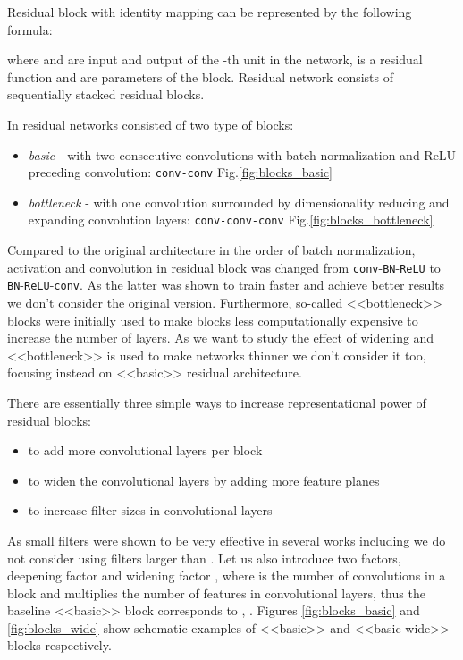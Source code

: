 \documentclass{bmvc2k}
\begin{document}
Residual block with identity mapping can be represented by the following formula:


where  and  are input and output of the -th unit in the network,  is a residual function and  are parameters of the block. Residual network consists of sequentially stacked residual blocks.

In \cite{basicblock2} residual networks consisted of two type of blocks:

\begin{itemize}
  \item{\textit{basic} - with two consecutive  convolutions with batch normalization and ReLU preceding convolution: \texttt{conv-conv} Fig.\ref{fig:blocks_basic}}
  \item{\textit{bottleneck} - with one  convolution surrounded by dimensionality reducing and expanding  convolution layers: \texttt{conv-conv-conv} Fig.\ref{fig:blocks_bottleneck}}
\end{itemize}

Compared to the original architecture \cite{he2015deep} in \cite{basicblock2} the order of batch normalization, activation and convolution in residual block was changed from \texttt{conv}-\texttt{BN}-\texttt{ReLU} to \texttt{BN}-\texttt{ReLU}-\texttt{conv}. As the latter was shown to train faster and achieve better results we don't consider the original version.
Furthermore,
so-called  <<bottleneck>> blocks were initially used to make blocks less computationally expensive to increase the number of layers. As we want to study the effect of widening and <<bottleneck>> is used to make networks thinner we don't consider it too,  focusing instead on  <<basic>> residual architecture.

There are essentially three simple ways to increase representational power of residual blocks:
\vspace{-0.1cm}
\begin{itemize}
    \setlength\itemsep{-0.2em}
  \item{to add more convolutional layers per block}
  \item{to widen the convolutional layers by adding more feature planes}
  \item{to increase filter sizes in convolutional layers}
\end{itemize}

As small filters were shown to be very effective in several works including \cite{Simonyan15,inception-v4} we do not  consider using filters larger than .
Let us also introduce two factors, deepening factor  and widening factor , where  is the number of convolutions in a block and  multiplies the number of features in convolutional layers, thus the baseline <<basic>> block corresponds to  , . Figures \ref{fig:blocks_basic} and \ref{fig:blocks_wide} show schematic examples of <<basic>> and <<basic-wide>> blocks respectively.
\end{document}
